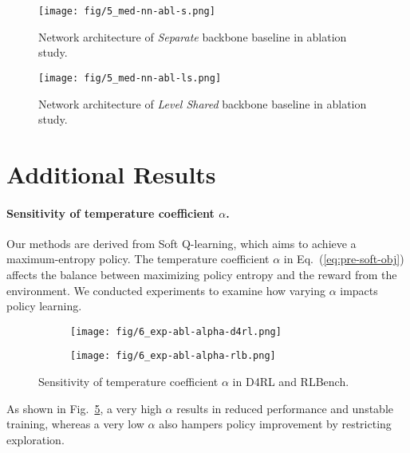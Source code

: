 \begin{figure}[h]
    \centering
    \texttt{[image: fig/5\_med-nn-abl-s.png]}
    \caption{Network architecture of \textit{Separate} backbone baseline in ablation study.}
    \label{fig:app-baseline-abl-nn-s}
\end{figure}

\begin{figure}[h]
    \centering
    \texttt{[image: fig/5\_med-nn-abl-ls.png]}
    \caption{Network architecture of \textit{Level Shared} backbone baseline in ablation study.}
    \label{fig:app-baseline-abl-nn-ls}
\end{figure}



\section{Additional Results}
\label{sec:app-exp}

\paragraph{Sensitivity of temperature coefficient $\alpha$.}
Our methods are derived from Soft Q-learning, which aims to achieve a maximum-entropy policy.
The temperature coefficient $\alpha$ in Eq.~(\ref{eq:pre-soft-obj}) affects the balance between maximizing policy entropy and the reward from the environment. 
We conducted experiments to examine how varying $\alpha$ impacts policy learning. 

\begin{figure}[h]
    \centering
    \begin{subfigure}[t]{0.30\textwidth}
        \centering
        \texttt{[image: fig/6\_exp-abl-alpha-d4rl.png]}
        \label{fig:exp-abl-alpha-d4rl}
    \end{subfigure}
    \hspace{0.01\textwidth}
    \begin{subfigure}[t]{0.30\textwidth}
        \centering
        \texttt{[image: fig/6\_exp-abl-alpha-rlb.png]}
        \label{fig:exp-abl-alpha-rlb}
    \end{subfigure}
    \caption{Sensitivity of temperature coefficient $\alpha$ in D4RL and RLBench.}
    \label{fig:exp-abl-alpha}
\end{figure}

As shown in Fig.~\ref{fig:exp-abl-alpha}, a very high $\alpha$ results in reduced performance and unstable training, whereas a very low $\alpha$ also hampers policy improvement by restricting exploration.


